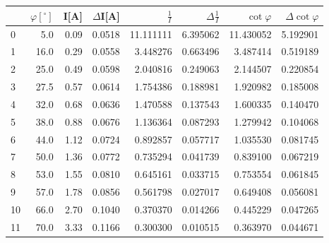 \begin{tabular}{lrrrrrrr}
\toprule
{} &  $\varphi[^\circ]$ &  I[A] &  $\Delta$I[A] &  $\frac{1}{I}$ &  $\Delta \frac{1}{I}$ &  $\cot{\varphi}$ &  $\Delta \cot{\varphi}$ \\
\midrule
0  &                5.0 &  0.09 &        0.0518 &      11.111111 &              6.395062 &        11.430052 &                5.192901 \\
1  &               16.0 &  0.29 &        0.0558 &       3.448276 &              0.663496 &         3.487414 &                0.519189 \\
2  &               25.0 &  0.49 &        0.0598 &       2.040816 &              0.249063 &         2.144507 &                0.220854 \\
3  &               27.5 &  0.57 &        0.0614 &       1.754386 &              0.188981 &         1.920982 &                0.185008 \\
4  &               32.0 &  0.68 &        0.0636 &       1.470588 &              0.137543 &         1.600335 &                0.140470 \\
5  &               38.0 &  0.88 &        0.0676 &       1.136364 &              0.087293 &         1.279942 &                0.104068 \\
6  &               44.0 &  1.12 &        0.0724 &       0.892857 &              0.057717 &         1.035530 &                0.081745 \\
7  &               50.0 &  1.36 &        0.0772 &       0.735294 &              0.041739 &         0.839100 &                0.067219 \\
8  &               53.0 &  1.55 &        0.0810 &       0.645161 &              0.033715 &         0.753554 &                0.061845 \\
9  &               57.0 &  1.78 &        0.0856 &       0.561798 &              0.027017 &         0.649408 &                0.056081 \\
10 &               66.0 &  2.70 &        0.1040 &       0.370370 &              0.014266 &         0.445229 &                0.047265 \\
11 &               70.0 &  3.33 &        0.1166 &       0.300300 &              0.010515 &         0.363970 &                0.044671 \\
\bottomrule
\end{tabular}
